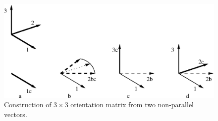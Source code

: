 \begin{figure}[h]
\centering
{}
\includegraphics[width=.9\textwidth]{MatR2vec}
\caption{Construction of $3 \times 3$ orientation matrix from two
non-parallel vectors.}
\label{fig:general:orientation-matrices:MatR2vec}
\end{figure}

